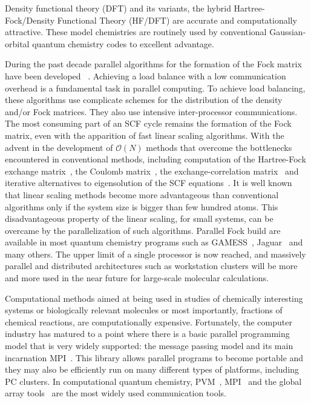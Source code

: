 \documentclass[twocolumn,showkeys,showpacs,preprintnumbers,amsmath,amssymb]{revtex4}
\begin{document}
 Density functional theory (DFT) and its variants, 
 the hybrid Hartree-Fock/Density Functional Theory (HF/DFT) are accurate and
 computationally attractive. These model chemistries are routinely used
 by conventional Gaussian-orbital quantum chemistry codes to excellent
 advantage.

 During the past decade parallel algorithms for the 
 formation of the Fock matrix have been developed
 ~\cite{MColvin93,TFurlani95,RHarrison96,HTakashima02}.
 Achieving a load balance with a low communication overhead
 is a fundamental task in parallel computing.
 To achieve load balancing, these algorithms use complicate
 schemes for the distribution of the density and/or Fock 
 matrices. They also use intensive inter-processor 
 communications. 
 The most consuming part of an SCF cycle remains the formation
 of the Fock matrix, even with the apparition of fast linear
 scaling algorithms. 
 With the advent in the development of $\mathcal{O}(N)$ methods
 that overcome the bottlenecks encountered in conventional methods,
 including computation of the Hartree-Fock exchange 
 matrix~\cite{ESchwegler96,ESchwegler97,ESchwegler98A,ESchwegler99,ESchwegler00,CTymczak04b},
 the Coulomb 
 matrix~\cite{CWhite94B,CWhite96A,MChallacombe96,MChallacombe96B,MStrain96,
              JPerezjorda97,MChallacombe97,CTymczak04a}, 
 the exchange-correlation 
 matrix~\cite{CTymczak04a,Jorda95,RStratmann96,CGuerra98,MChallacombe00A}
 and iterative alternatives to eigensolution of the SCF 
 equations~\cite{XLi93,MDaw93,ADaniels97,APalser98,MChallacombe99,ANiklasson02A,ANiklasson03}.
 It is well known that linear scaling 
 methods become more advantageous than conventional  
 algorithms only if the system size is bigger than
 few hundred atoms. This disadvantageous property of the linear
 scaling, for small systems, can be overcame by the
 parallelization of such algorithms. 
 Parallel Fock build are available in most quantum
 chemistry programs such as GAMESS~\cite{GAMESS},
 Jaguar~\cite{DChasman98} and many others. 
 The upper limit of a single processor
 is now reached, and massively parallel and distributed
 architectures such as workstation clusters will be 
 more and more used in the near future for large-scale 
 molecular calculations.

 Computational methods aimed at being used in studies of 
 chemically interesting systems or biologically relevant molecules
 or most importantly, fractions of chemical reactions, are
 computationally expensive. Fortunately, the computer 
 industry has matured to a point where there is a basic parallel
 programming model that is very widely supported: the message 
 passing model and its main incarnation MPI~\cite{MPI}. This library
 allows parallel programs to become portable and they may
 also be efficiently run on many different types of platforms, 
 including PC clusters.
 In computational quantum chemistry, PVM~\cite{PVM}, MPI~\cite{MPI} and the 
 global array tools~\cite{JNieplocha94,JNieplocha96} are 
 the most widely used communication tools.
 
\end{document}
